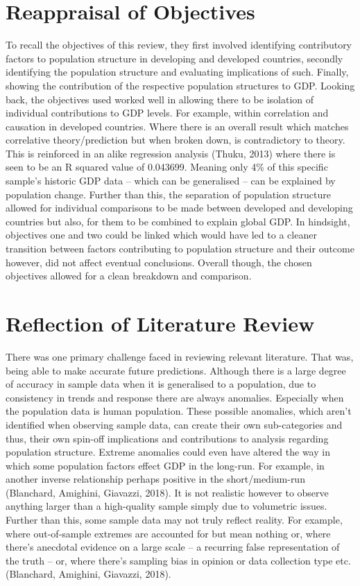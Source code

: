 \documentclass[11pt, english]{article}
\begin{document}
\newpage

\section{Reappraisal of Objectives}

	To recall the objectives of this review, they first involved identifying contributory factors to population structure in developing and developed countries, secondly identifying the population structure and evaluating implications of such. Finally, showing the contribution of the respective population structures to GDP.  Looking back, the objectives used worked well in allowing there to be isolation of individual contributions to GDP levels. For example, within correlation and causation in developed countries. Where there is an overall result which matches correlative theory/prediction but when broken down, is contradictory to theory. This is reinforced in an alike regression analysis (Thuku, 2013) where there is seen to be an R squared value of 0.043699. Meaning only 4\% of this specific sample’s historic GDP data – which can be generalised – can be explained by population change. Further than this, the separation of population structure allowed for individual comparisons to be made between developed and developing countries but also, for them to be combined to explain global GDP. In hindsight, objectives one and two could be linked which would have led to a cleaner transition between factors contributing to population structure and their outcome however, did not affect eventual conclusions. Overall though, the chosen objectives allowed for a clean breakdown and comparison.

\newpage

\section{Reflection of Literature Review}

	There was one primary challenge faced in reviewing relevant literature. That was, being able to make accurate future predictions. Although there is a large degree of accuracy in sample data when it is generalised to a population, due to consistency in trends and response there are always anomalies. Especially when the population data is human population. These possible anomalies, which aren’t identified when observing sample data, can create their own sub-categories and thus, their own spin-off implications and contributions to analysis regarding population structure. Extreme anomalies could even have altered the way in which some population factors effect GDP in the long-run. For example, in another inverse relationship perhaps positive in the short/medium-run (Blanchard, Amighini, Giavazzi, 2018). It is not realistic however to observe anything larger than a high-quality sample simply due to volumetric issues. Further than this, some sample data may not truly reflect reality. For example, where out-of-sample extremes are accounted for but mean nothing or, where there’s anecdotal evidence on a large scale – a recurring false representation of the truth – or, where there’s sampling bias in opinion or data collection type etc. (Blanchard, Amighini, Giavazzi, 2018).\\
\end{document}
